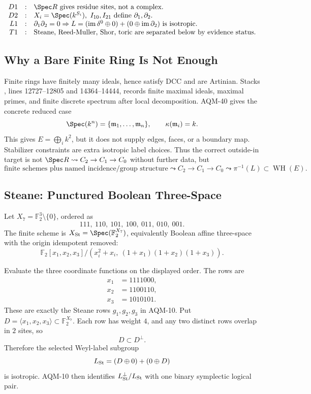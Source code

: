 \[
\begin{array}{rcl}
D1&:&\Spec R\text{ gives residue sites, not a complex.}\\
D2&:&X_i=\Spec(k^{S_i}),\ I_{10},I_{21}\text{ define }\partial_1,\partial_2.\\
L1&:&\partial_1\partial_2=0\Rightarrow
L=(\operatorname{im}\delta^0\oplus0)+(0\oplus\operatorname{im}\partial_2)
\text{ is isotropic.}\\
T1&:&\text{Steane, Reed-Muller, Shor, toric are separated below by evidence status.}
\end{array}
\]

\subsection{Why a Bare Finite Ring Is Not Enough}

Finite rings have finitely many ideals, hence satisfy DCC and are Artinian.
Stacks , lines 12727--12805 and 14364--14444, records finite maximal ideals, maximal primes, and finite discrete spectrum after local decomposition.  AQM-40 gives the concrete reduced case
\[
  \Spec(k^n)=\{\mathfrak m_1,\ldots,\mathfrak m_n\},
  \qquad \kappa(\mathfrak m_i)=k.
\]
This gives \(E=\bigoplus_i k^2\), but it does not supply edges, faces, or a
boundary map.  Stabilizer constraints are extra isotropic label choices.  Thus
the correct outside-in target is not \(\Spec R\leadsto C_2\to C_1\to C_0\)
without further data, but
\[
  \text{finite schemes plus named incidence/group structure}
  \leadsto C_2\to C_1\to C_0
  \leadsto \pi^{-1}(L)\subset\operatorname{WH}(E).
\]

\subsection{Steane: Punctured Boolean Three-Space}

Let \(X_7=\mathbb F_2^3\setminus\{0\}\), ordered as
\[
  111,\ 110,\ 101,\ 100,\ 011,\ 010,\ 001 .
\]
The finite scheme is \(X_{\rm St}=\Spec(\mathbb F_2^{X_7})\), equivalently
Boolean affine three-space with the origin idempotent removed:
\[
  \mathbb F_2[x_1,x_2,x_3]/(x_i^2+x_i,\ (1+x_1)(1+x_2)(1+x_3)).
\]

Evaluate the three coordinate functions on the displayed order.  The rows are
\[
\begin{aligned}
  x_1&=1111000,\\
  x_2&=1100110,\\
  x_3&=1010101.
\end{aligned}
\]
These are exactly the Steane rows \(g_1,g_2,g_3\) in AQM-10.  Put
\(D=\langle x_1,x_2,x_3\rangle\subset\mathbb F_2^{X_7}\).  Each row has weight
\(4\), and any two distinct rows overlap in \(2\) sites, so
\[
  D\subset D^\perp .
\]
Therefore the selected Weyl-label subgroup
\[
  L_{\rm St}=(D\oplus0)+(0\oplus D)
\]
is isotropic.  AQM-10 then identifies \(L_{\rm St}^\perp/L_{\rm St}\) with one
binary symplectic logical pair.

